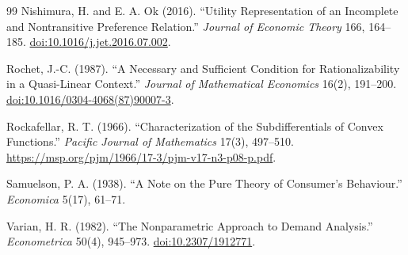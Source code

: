 \documentclass[11pt]{article}
\theoremstyle{definition}
\theoremstyle{remark}
\begin{document}
\begin{thebibliography}{99}
Nishimura, H. and E. A. Ok (2016).
``Utility Representation of an Incomplete and Nontransitive Preference Relation.''
\emph{Journal of Economic Theory} 166, 164--185.
\href{https://doi.org/10.1016/j.jet.2016.07.002}{doi:10.1016/j.jet.2016.07.002}.

Rochet, J.-C. (1987).
``A Necessary and Sufficient Condition for Rationalizability in a Quasi-Linear Context.''
\emph{Journal of Mathematical Economics} 16(2), 191--200.
\href{https://doi.org/10.1016/0304-4068(87)90007-3}{doi:10.1016/0304-4068(87)90007-3}.

Rockafellar, R. T. (1966).
``Characterization of the Subdifferentials of Convex Functions.''
\emph{Pacific Journal of Mathematics} 17(3), 497--510.
\url{https://msp.org/pjm/1966/17-3/pjm-v17-n3-p08-p.pdf}.

Samuelson, P. A. (1938).
``A Note on the Pure Theory of Consumer's Behaviour.''
\emph{Economica} 5(17), 61--71.

Varian, H. R. (1982).
``The Nonparametric Approach to Demand Analysis.''
\emph{Econometrica} 50(4), 945--973.
\href{https://doi.org/10.2307/1912771}{doi:10.2307/1912771}.

\end{thebibliography}
\end{document}
